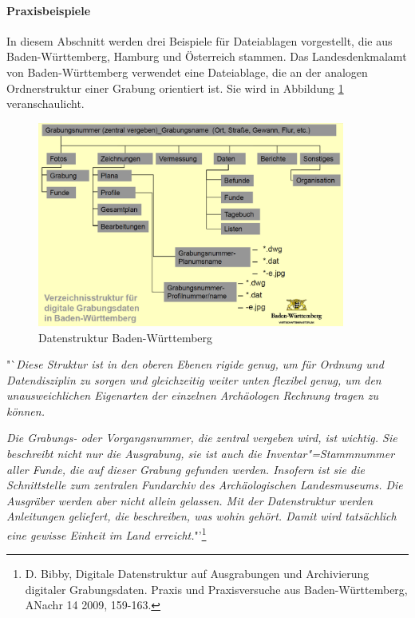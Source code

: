 \paragraph{Praxisbeispiele} In diesem Abschnitt werden drei Beispiele für Dateiablagen vorgestellt, die aus Baden-Württemberg, Hamburg und Österreich stammen. Das Landesdenkmalamt von Baden-Württemberg verwendet eine Dateiablage, die an der analogen Ordnerstruktur einer Grabung orientiert ist. Sie wird in Abbildung \ref{OrdnerstrukturBaWue} veranschaulicht.

\begin{figure}[h!tb]
  \begin{center}
    \includegraphics[width=0.9\textwidth]{bilder/OrdnerstrukturBaWue_Bibby}
  \end{center}
  \caption{Datenstruktur Baden-Württemberg}
  \label{OrdnerstrukturBaWue}
\end{figure}

"`\emph{Diese Struktur ist in den oberen Ebenen rigide genug, um für Ordnung und Datendisziplin zu sorgen und gleichzeitig weiter unten flexibel genug, um den unausweichlichen Eigenarten der einzelnen Archäologen Rechnung tragen zu können.}

\emph{Die Grabungs- oder Vorgangsnummer, die zentral vergeben wird, ist wichtig. Sie beschreibt nicht nur die Ausgrabung, sie ist auch die Inventar"=Stammnummer aller Funde, die auf dieser Grabung gefunden werden. Insofern ist sie die Schnittstelle zum zentralen Fundarchiv des Archäologischen Landesmuseums. Die Ausgräber werden aber nicht allein gelassen. Mit der Datenstruktur werden Anleitungen geliefert, die beschreiben, was wohin gehört. Damit wird tatsächlich eine gewisse Einheit im Land erreicht.}"'\footnote{D. Bibby, Digitale Datenstruktur auf Ausgrabungen und Archivierung digitaler Grabungsdaten. Praxis und Praxisversuche aus Baden-Württemberg, ANachr 14 2009, 159-163.}

